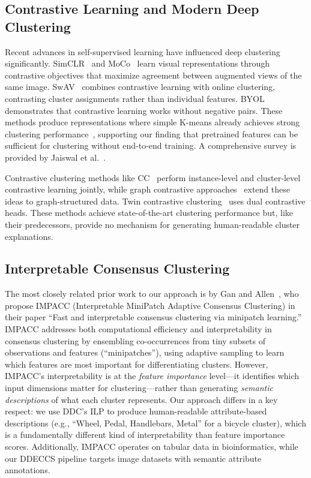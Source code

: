 \subsection{Contrastive Learning and Modern Deep Clustering}

Recent advances in self-supervised learning have influenced deep clustering significantly. SimCLR~\citep{Chen2020} and MoCo~\citep{He2020} learn visual representations through contrastive objectives that maximize agreement between augmented views of the same image. SwAV~\citep{Caron2020} combines contrastive learning with online clustering, contrasting cluster assignments rather than individual features. BYOL~\citep{Grill2020} demonstrates that contrastive learning works without negative pairs. These methods produce representations where simple K-means already achieves strong clustering performance~\citep{Caron2020}, supporting our finding that pretrained features can be sufficient for clustering without end-to-end training. A comprehensive survey is provided by Jaiswal et al.~\citep{Jaiswal2021}.

Contrastive clustering methods like CC~\citep{Li2021} perform instance-level and cluster-level contrastive learning jointly, while graph contrastive approaches~\citep{Zhong2021} extend these ideas to graph-structured data. Twin contrastive clustering~\citep{Shen2021} uses dual contrastive heads. These methods achieve state-of-the-art clustering performance but, like their predecessors, provide no mechanism for generating human-readable cluster explanations.

\subsection{Interpretable Consensus Clustering}

The most closely related prior work to our approach is by Gan and Allen~\citep{Gan2022}, who propose IMPACC (Interpretable MiniPatch Adaptive Consensus Clustering) in their paper ``Fast and interpretable consensus clustering via minipatch learning.'' IMPACC addresses both computational efficiency and interpretability in consensus clustering by ensembling co-occurrences from tiny subsets of observations and features (``minipatches''), using adaptive sampling to learn which features are most important for differentiating clusters. However, IMPACC's interpretability is at the \emph{feature importance} level---it identifies which input dimensions matter for clustering---rather than generating \emph{semantic descriptions} of what each cluster represents. Our approach differs in a key respect: we use DDC's ILP to produce human-readable attribute-based descriptions (e.g., ``Wheel, Pedal, Handlebars, Metal'' for a bicycle cluster), which is a fundamentally different kind of interpretability than feature importance scores. Additionally, IMPACC operates on tabular data in bioinformatics, while our DDECCS pipeline targets image datasets with semantic attribute annotations.

